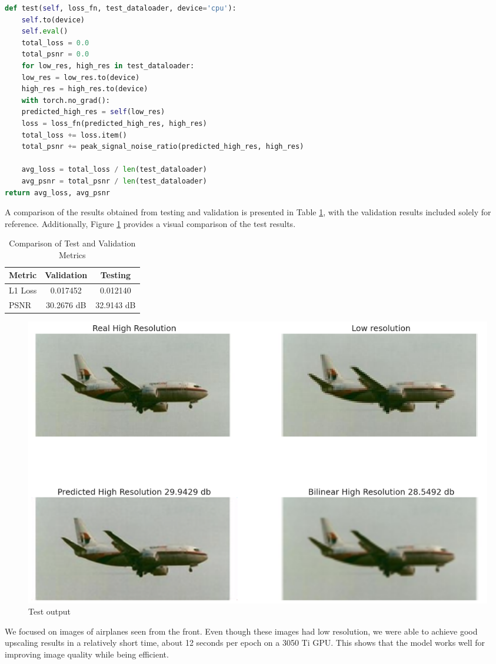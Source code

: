 \documentclass[../report.tex]{subfiles}
\begin{document}
\begin{lstlisting}[style=python, language=python, label={lst:test}, caption={Testing Method}]
def test(self, loss_fn, test_dataloader, device='cpu'):
	self.to(device)
	self.eval()
	total_loss = 0.0
	total_psnr = 0.0
	for low_res, high_res in test_dataloader:
	low_res = low_res.to(device)
	high_res = high_res.to(device)
	with torch.no_grad():
	predicted_high_res = self(low_res)
	loss = loss_fn(predicted_high_res, high_res)
	total_loss += loss.item()
	total_psnr += peak_signal_noise_ratio(predicted_high_res, high_res)
	
	avg_loss = total_loss / len(test_dataloader)
	avg_psnr = total_psnr / len(test_dataloader)
return avg_loss, avg_psnr
\end{lstlisting}
A comparison of the results obtained from testing and validation is presented in Table \ref{tab:test_results}, with the validation results included solely for reference. Additionally, Figure \ref{fig:test} provides a visual comparison of the test results.
\begin{table}[H]
	\centering
	\caption{Comparison of Test and Validation Metrics}
	\begin{tabular}{@{}lcc@{}}
		\toprule
		\textbf{Metric} & \textbf{Validation} & \textbf{Testing} \\ \midrule
		L1 Loss         & 0.017452            & 0.012140         \\ 
		PSNR            & 30.2676 dB         & 32.9143 dB       \\ 
		\bottomrule
	\end{tabular}
	\label{tab:test_results}
\end{table}
\begin{figure}[H]
	\caption{Test output}
	\centering
	\label{fig:test}
	\includegraphics[width=\textwidth]{../images/test.png}
\end{figure}
We focused on images of airplanes seen from the front. Even though these images had low resolution, we were able to achieve good upscaling results in a relatively short time, about 12 seconds per epoch on a 3050 Ti GPU. This shows that the model works well for improving image quality while being efficient.
\end{document}
